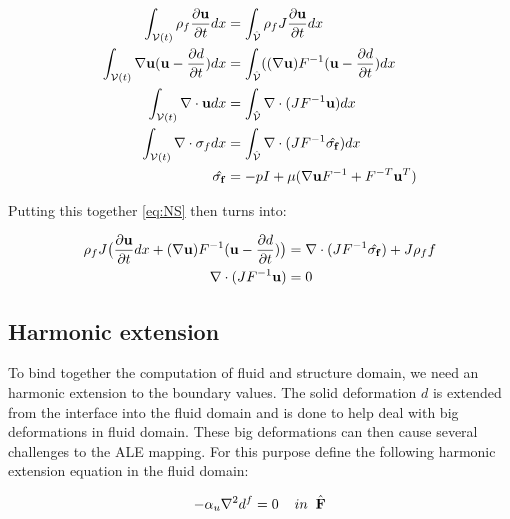 \begin{align}
\int_{\mathcal{V}(t)} \rho_f \frac{\partial \bold{u}}{\partial t} dx & = \int_{\hat{\mathcal{V}}}  \rho_f J \frac{\partial \bold{u}}{\partial t} dx \\
\int_{\mathcal{V}(t)} \nabla \bold{u} (\bold{u}-\frac{\partial d}{\partial t}) dx  &= \int_{\hat{\mathcal{V}}} ((\nabla \bold{u})F^{-1}(\bold{u}-\frac{\partial d}{\partial t}) dx  \\
\int_{\mathcal{V}(t)} \nabla \cdot \bold{u} dx  &=\int_{\hat{\mathcal{V}}}  \nabla \cdot (J F^{-1} \bold{u}  ) dx \\
\int_{\mathcal{V}(t)} \nabla \cdot \sigma_f dx &= \int_{\hat{\mathcal{V}}} \nabla \cdot( J F^{-1} \hat{\sigma_f} )     dx \\
\hat{\sigma_f} &= -pI + \mu ( \nabla \bold{u} F^{-1} + F^{-T} \bold{u}^{T}  ) 
\end{align}

Putting this together \eqref{eq:NS} then turns into:

\begin{align}
\label{eq:NS_mapped}
\rho_f J \big( \frac{\partial \bold{u}}{\partial t} dx + (\nabla \bold{u})F^{-1}(\bold{u}-\frac{\partial d}{\partial t}) \big) &= \nabla \cdot( J F^{-1} \hat{\sigma_f} ) + J \rho_f f \\
\nabla \cdot (J F^{-1} \bold{u} ) &= 0
\end{align} 

\subsection*{Harmonic extension}
To bind together the computation of fluid and structure domain, we need an harmonic extension to the boundary values. The solid deformation $d$ is extended from the interface into the fluid domain and is done to help deal with big deformations in fluid domain. These big deformations can then cause several challenges to the ALE mapping. 
For this purpose define the following harmonic extension equation in the fluid domain:

\begin{equation}
 - \alpha_u \nabla^2 d^f = 0\hspace{4mm}in \hspace{2mm} \mathcal{\hat{F}}
\end{equation}

